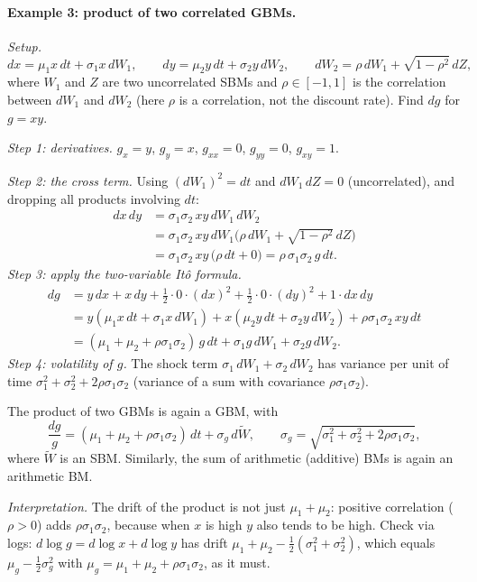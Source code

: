 \paragraph{Example 3: product of two correlated GBMs.}
\textit{Setup.}
\[
dx=\mu_1x\,dt+\sigma_1x\,dW_1,\qquad dy=\mu_2y\,dt+\sigma_2y\,dW_2,\qquad dW_2=\rho\,dW_1+\sqrt{1-\rho^2}\,dZ,
\]
where $W_1$ and $Z$ are two uncorrelated SBMs and $\rho\in[-1,1]$ is the correlation between $dW_1$ and $dW_2$ (here $\rho$ is a correlation, not the discount rate). Find $dg$ for $g=xy$.

\textit{Step 1: derivatives.} $g_x=y$, $g_y=x$, $g_{xx}=0$, $g_{yy}=0$, $g_{xy}=1$.

\textit{Step 2: the cross term.} Using $(dW_1)^2=dt$ and $dW_1\,dZ=0$ (uncorrelated), and dropping all products involving $dt$:
\begin{align*}
dx\,dy&=\sigma_1\sigma_2\,xy\,dW_1\,dW_2\\
&=\sigma_1\sigma_2\,xy\,dW_1\big(\rho\,dW_1+\sqrt{1-\rho^2}\,dZ\big)\\
&=\sigma_1\sigma_2\,xy\,\big(\rho\,dt+0\big)=\rho\,\sigma_1\sigma_2\,g\,dt.
\end{align*}
\textit{Step 3: apply the two-variable It\^o formula.}
\begin{align*}
dg&=y\,dx+x\,dy+\tfrac12\cdot0\cdot(dx)^2+\tfrac12\cdot0\cdot(dy)^2+1\cdot dx\,dy\\
&=y(\mu_1x\,dt+\sigma_1x\,dW_1)+x(\mu_2y\,dt+\sigma_2y\,dW_2)+\rho\sigma_1\sigma_2\,xy\,dt\\
&=(\mu_1+\mu_2+\rho\sigma_1\sigma_2)\,g\,dt+\sigma_1g\,dW_1+\sigma_2g\,dW_2.
\end{align*}
\textit{Step 4: volatility of $g$.} The shock term $\sigma_1\,dW_1+\sigma_2\,dW_2$ has variance per unit of time
$\sigma_1^2+\sigma_2^2+2\rho\sigma_1\sigma_2$ (variance of a sum with covariance $\rho\sigma_1\sigma_2$).

\begin{keybox}[title=Takeaways]
The product of two GBMs is again a GBM, with
\[
\frac{dg}{g}=(\mu_1+\mu_2+\rho\sigma_1\sigma_2)\,dt+\sigma_g\,d\widetilde W,\qquad \sigma_g=\sqrt{\sigma_1^2+\sigma_2^2+2\rho\sigma_1\sigma_2},
\]
where $\widetilde W$ is an SBM. Similarly, the sum of arithmetic (additive) BMs is again an arithmetic BM.
\end{keybox}
\textit{Interpretation.} The drift of the product is not just $\mu_1+\mu_2$: positive correlation ($\rho>0$) adds $\rho\sigma_1\sigma_2$, because when $x$ is high $y$ also tends to be high. Check via logs: $d\log g=d\log x+d\log y$ has drift $\mu_1+\mu_2-\tfrac12(\sigma_1^2+\sigma_2^2)$, which equals $\mu_g-\tfrac12\sigma_g^2$ with $\mu_g=\mu_1+\mu_2+\rho\sigma_1\sigma_2$, as it must.

